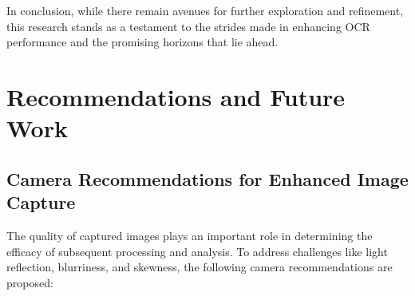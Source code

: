 In conclusion, while there remain avenues for further exploration and refinement, this research stands as a testament to the strides made in enhancing OCR performance and the promising horizons that lie ahead.



\section{Recommendations and Future Work}

\subsection{Camera Recommendations for Enhanced Image Capture}

The quality of captured images plays an important role in determining the efficacy of subsequent processing and analysis. To address challenges like light reflection, blurriness, and skewness, the following camera recommendations are proposed:

